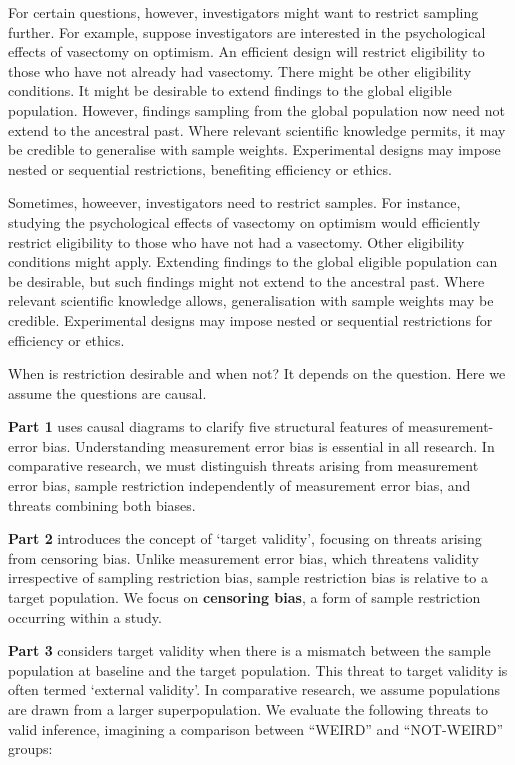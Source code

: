 \documentclass[
  single column]{article}
\begin{document}
For certain questions, however, investigators might want to restrict
sampling further. For example, suppose investigators are interested in
the psychological effects of vasectomy on optimism. An efficient design
will restrict eligibility to those who have not already had vasectomy.
There might be other eligibility conditions. It might be desirable to
extend findings to the global eligible population. However, findings
sampling from the global population now need not extend to the ancestral
past. Where relevant scientific knowledge permits, it may be credible to
generalise with sample weights. Experimental designs may impose nested
or sequential restrictions, benefiting efficiency or ethics.

Sometimes, howeever, investigators need to restrict samples. For
instance, studying the psychological effects of vasectomy on optimism
would efficiently restrict eligibility to those who have not had a
vasectomy. Other eligibility conditions might apply. Extending findings
to the global eligible population can be desirable, but such findings
might not extend to the ancestral past. Where relevant scientific
knowledge allows, generalisation with sample weights may be credible.
Experimental designs may impose nested or sequential restrictions for
efficiency or ethics.

When is restriction desirable and when not? It depends on the question.
Here we assume the questions are causal.

\textbf{Part 1} uses causal diagrams to clarify five structural features
of measurement-error bias. Understanding measurement error bias is
essential in all research. In comparative research, we must distinguish
threats arising from measurement error bias, sample restriction
independently of measurement error bias, and threats combining both
biases.

\textbf{Part 2} introduces the concept of `target validity', focusing on
threats arising from censoring bias. Unlike measurement error bias,
which threatens validity irrespective of sampling restriction bias,
sample restriction bias is relative to a target population. We focus on
\textbf{censoring bias}, a form of sample restriction occurring within a
study.

\textbf{Part 3} considers target validity when there is a mismatch
between the sample population at baseline and the target population.
This threat to target validity is often termed `external validity'. In
comparative research, we assume populations are drawn from a larger
superpopulation. We evaluate the following threats to valid inference,
imagining a comparison between ``WEIRD'' and ``NOT-WEIRD'' groups:
\end{document}
